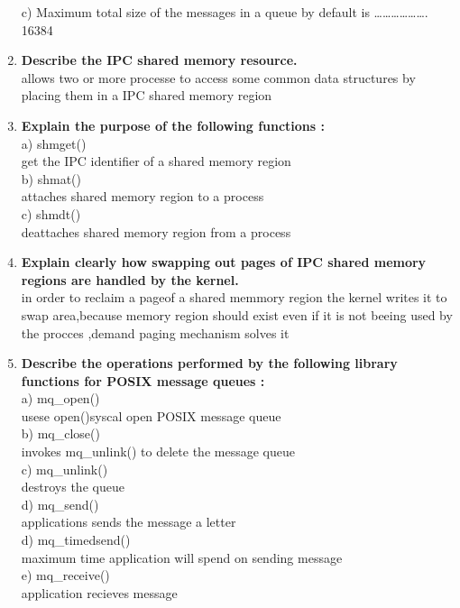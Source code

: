 \documentclass[a4paper,12pt]{article}
\begin{document}
\begin{flushleft}
\begin{enumerate}
c) Maximum total size of the messages in a queue by default is ……………….
{\color{red}16384}\\
\item \textbf{ Describe the IPC shared memory resource.}\\
{\color{red}allows two or more processe to access some common data structures by placing them in a IPC shared memory region}\\
\item \textbf{ Explain the purpose of the following functions :}\\
a) shmget()\\
{\color{red}get the IPC identifier of a shared memory region}\\
 b) shmat()\\ 
{\color{red}attaches shared memory region to a process}\\
 c) shmdt()\\
{\color{red}deattaches shared memory region from a process}\\
\item \textbf{ Explain clearly how swapping out pages of IPC shared memory regions are handled by the kernel.}\\
{\color{red}in order to reclaim a pageof a shared memmory region the kernel writes it to swap area,because memory region should exist even if it is not beeing used by the procces ,demand paging mechanism solves it}\\
\item \textbf{ Describe the operations performed by the following library functions for POSIX message queues :}\\
a) mq\_open()\\
 {\color{red}usese open()syscal open POSIX message queue}\\
b) mq\_close()\\
{\color{red}invokes  mq\_unlink() to delete the message queue }\\
  c) mq\_unlink()\\
{\color{red}destroys the queue}\\
   d) mq\_send()\\
{\color{red} applications sends the message a letter}\\
d) mq\_timedsend()\\
{\color{red}maximum time application will spend on sending message}\\
 e) mq\_receive() \\
{\color{red}application recieves message}\\

\end{enumerate}
\end{flushleft}
\end{document}
